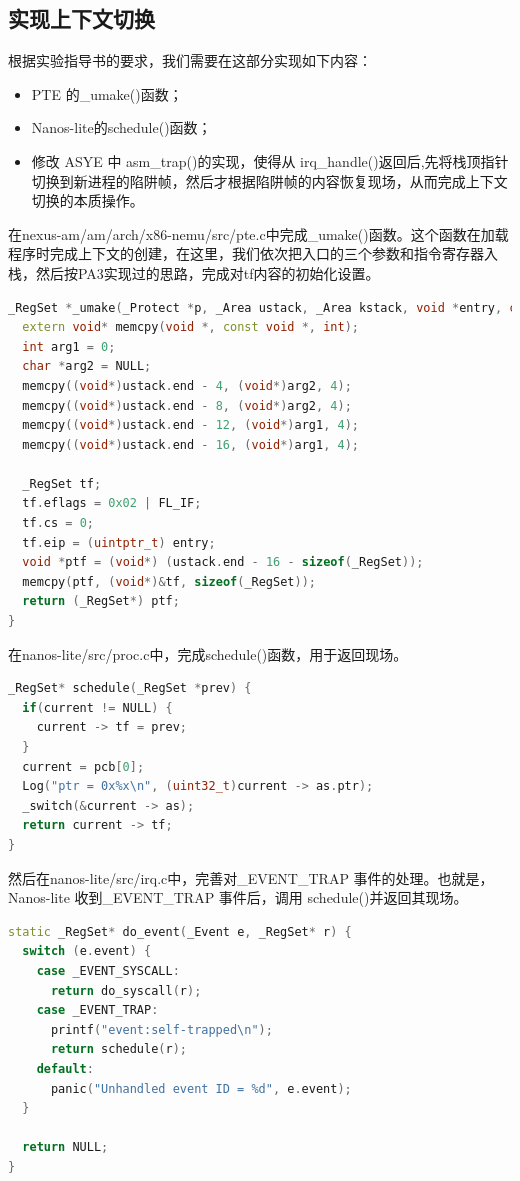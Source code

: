 \documentclass[UTF8,a4paper,10pt]{ctexart}
\begin{document}
\subsection{实现上下文切换}
根据实验指导书的要求，我们需要在这部分实现如下内容：
\begin{itemize}
\item PTE 的\_umake()函数；
\item Nanos-lite的schedule()函数；
\item 修改 ASYE 中 asm\_trap()的实现，使得从 irq\_handle()返回后,先将栈顶指针切换到新进程的陷阱帧，然后才根据陷阱帧的内容恢复现场，从而完成上下文切换的本质操作。
\end{itemize}
在nexus-am/am/arch/x86-nemu/src/pte.c中完成\_umake()函数。这个函数在加载程序时完成上下文的创建，在这里，我们依次把入口的三个参数和指令寄存器入栈，然后按PA3实现过的思路，完成对tf内容的初始化设置。
\begin{lstlisting}[language = C++]
_RegSet *_umake(_Protect *p, _Area ustack, _Area kstack, void *entry, char *const argv[], char *const envp[]) {
  extern void* memcpy(void *, const void *, int);
  int arg1 = 0;
  char *arg2 = NULL;
  memcpy((void*)ustack.end - 4, (void*)arg2, 4);
  memcpy((void*)ustack.end - 8, (void*)arg2, 4);
  memcpy((void*)ustack.end - 12, (void*)arg1, 4);
  memcpy((void*)ustack.end - 16, (void*)arg1, 4);

  _RegSet tf;
  tf.eflags = 0x02 | FL_IF;
  tf.cs = 0;
  tf.eip = (uintptr_t) entry;
  void *ptf = (void*) (ustack.end - 16 - sizeof(_RegSet));
  memcpy(ptf, (void*)&tf, sizeof(_RegSet));
  return (_RegSet*) ptf;
}
\end{lstlisting}
在nanos-lite/src/proc.c中，完成schedule()函数，用于返回现场。
\begin{lstlisting}[language = C++]
_RegSet* schedule(_RegSet *prev) {
  if(current != NULL) {
    current -> tf = prev;
  }
  current = pcb[0];
  Log("ptr = 0x%x\n", (uint32_t)current -> as.ptr);
  _switch(&current -> as);
  return current -> tf;
}

\end{lstlisting}
然后在nanos-lite/src/irq.c中，完善对\_EVENT\_TRAP 事件的处理。也就是，Nanos-lite 收到\_EVENT\_TRAP 事件后，调用 schedule()并返回其现场。

\begin{lstlisting}[language = C++]
static _RegSet* do_event(_Event e, _RegSet* r) {
  switch (e.event) {
    case _EVENT_SYSCALL:
      return do_syscall(r);
    case _EVENT_TRAP:
      printf("event:self-trapped\n");
      return schedule(r);
    default: 
      panic("Unhandled event ID = %d", e.event);
  }

  return NULL;
}
\end{lstlisting}
\end{document}
